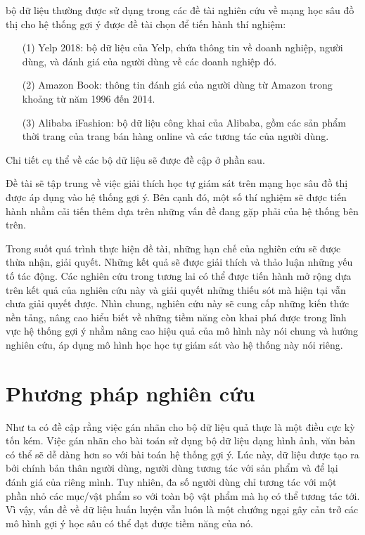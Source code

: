  bộ dữ liệu thường được sử dụng trong các đề tài nghiên cứu về mạng học sâu đồ thị cho hệ thống gợi ý được đề tài chọn để tiến hành thí nghiệm:
\begin{itemize}
    \item[(1)] Yelp 2018: bộ dữ liệu của Yelp, chứa thông tin về doanh nghiệp, người dùng, và đánh giá của người dùng về các doanh nghiệp đó.

    \item[(2)] Amazon Book: thông tin đánh giá của người dùng từ Amazon trong khoảng từ năm 1996 đến 2014.

    \item[(3)] Alibaba iFashion: bộ dữ liệu công khai của Alibaba, gồm các sản phẩm thời trang của trang bán hàng online và các tương tác của người dùng.
\end{itemize}
Chi tiết cụ thể về các bộ dữ liệu sẽ được đề cập ở phần sau.

Đề tài sẽ tập trung về việc giải thích học tự giám sát trên mạng học sâu đồ thị được áp dụng vào hệ thống gợi ý. Bên cạnh đó, một số thí nghiệm sẽ được tiến hành nhằm cải tiến thêm dựa trên những vấn đề đang gặp phải của hệ thống bên trên.

Trong suốt quá trình thực hiện đề tài, những hạn chế của nghiên cứu sẽ được thừa nhận, giải quyết. Những kết quả sẽ được giải thích và thảo luận những yếu tố tác động. Các nghiên cứu trong tương lai có thể  được tiến hành mở rộng dựa trên kết quả của nghiên cứu này và giải quyết những thiếu sót mà hiện tại vẫn chưa giải quyết được. Nhìn chung, nghiên cứu này sẽ cung cấp những kiến thức nền tảng, nâng cao hiểu biết về những tiềm năng còn khai phá được trong lĩnh vực hệ thống gợi ý nhằm nâng cao hiệu quả của mô hình này nói chung và hướng nghiên cứu, áp dụng mô hình học học tự giám sát vào hệ thống này nói riêng.

\section{Phương pháp nghiên cứu}

\noindent Như ta có đề cập rằng việc gán nhãn cho bộ dữ liệu quả thực là một điều cực kỳ tốn kém. Việc gán nhãn cho bài toán sử dụng bộ dữ liệu dạng hình ảnh, văn bản có thể sẽ dễ dàng hơn so với bài toán hệ thống gợi ý. Lúc này, dữ liệu được tạo ra bởi chính bản thân người dùng, người dùng tương tác với sản phẩm và để lại đánh giá của riêng mình. Tuy nhiên, đa số người dùng chỉ tương tác với một phần nhỏ các mục/vật phẩm so với toàn bộ vật phẩm mà họ có thể tương tác tới. Vì vậy, vấn đề về dữ liệu huấn luyện vẫn luôn là một chướng ngại gây cản trở các mô hình gợi ý học sâu có thể đạt được tiềm năng của nó.

